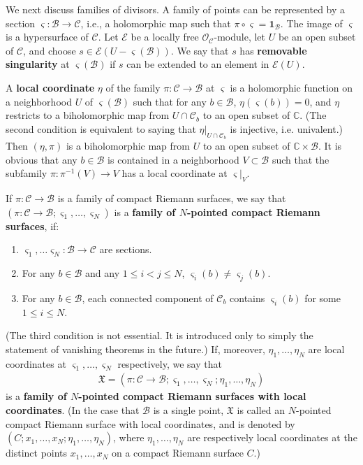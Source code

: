 \documentclass[12pt,b5paper,notitlepage]{report}
\theoremstyle{definition}
\theoremstyle{plain}
\newcommand{\fk}{\mathfrak}
\newcommand{\mc}{\mathcal}
\newcommand{\wtd}{\widetilde}
\newcommand{\id}{\mathbf{1}}
\newcommand{\scr}{\mathscr}
\newcommand{\sgm}{\varsigma}
\numberwithin{equation}{section}
\begin{document}
We next discuss families of divisors. A family of points can be represented by a  section $\sgm:\mc B\rightarrow\mc C$, i.e., a holomorphic map such that $\pi\circ \sgm=\id_{\mc B}$. The image of $\sgm$ is a hypersurface of $\mc C$. Let $\scr E$ be a locally free $\scr O_{\mc C}$-module, let $U$ be  an open subset of $\mc C$, and choose  $s\in\scr E(U-\sgm(\mc B))$. We say that $s$ has \textbf{removable singularity} at $\sgm(\mc B)$ if $s$ can be extended to an element in $\scr E(U)$. 

A \textbf{local coordinate} $\eta$ of the family $\pi:\mc C\rightarrow\mc B$ at $\sgm$ is a holomorphic function on a neighborhood $U$ of $\sgm(\mc B)$  such that for any $b\in \mc B$,  $\eta(\sgm(b))=0$, and  $\eta$  restricts to a biholomorphic map from $U\cap\mc C_b$ to an open subset of $\mathbb C$. (The second condition is equivalent to saying that $\eta|_{U\cap\mc C_b}$ is injective, i.e. univalent.)  Then $(\eta,\pi)$ is a biholomorphic map from $U$ to an open subset of $\mathbb C\times\mc B$. It is obvious that  any $b\in\mc B$ is contained in a neighborhood $V\subset\mc B$ such that the subfamily $\pi:\pi^{-1}(V)\rightarrow V$ has a local coordinate at $\sgm|_V$.

If $\pi:\mc C\rightarrow\mc B$ is a family of compact Riemann surfaces, we say that $(\pi:\mc C\rightarrow\mc B;\sgm_1,\dots,\sgm_N)$ is a \textbf{family of $N$-pointed compact Riemann surfaces}, if: 
\begin{enumerate}[label=(\alph*)]
\item $\sgm_1,\dots\sgm_N:\mc B\rightarrow\mc C$ are sections.
\item For any $b\in\mc B$ and any $1\leq i<j\leq N$, $\sgm_i(b)\neq\sgm_j(b)$.
\item For any $b\in\mc B$, each connected component of $\mc C_b$ contains $\sgm_i(b)$ for some $1\leq i\leq N$.
\end{enumerate}
(The third condition is not essential. It is introduced only to simply the statement  of vanishing theorems in the future.) If, moreover, $\eta_1,\dots,\eta_N$ are local coordinates at $\sgm_1,\dots,\sgm_N$ respectively, we say that
\begin{align*}
\fk X=(\pi:\mc C\rightarrow\mc B;\sgm_1,\dots,\sgm_N;\eta_1,\dots,\eta_N)
\end{align*}
is a \textbf{family of $N$-pointed compact Riemann surfaces with local coordinates}. \index{XX@$\wtd {\fk X}$ and $\fk X$} (In the case that $\mc B$ is a single point, $\fk X$ is called an $N$-pointed compact Riemann surface with local coordinates, and is denoted by $(C;x_1,\dots,x_N;\eta_1,\dots,\eta_N)$, where $\eta_1,\dots,\eta_N$ are respectively local coordinates at the distinct points $x_1,\dots,x_N$ on a compact Riemann surface $C$.)
\end{document}

